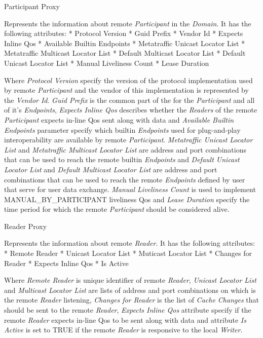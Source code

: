 \secc Participant Proxy

Represents the information about remote {\em Participant} in the {\em Domain}. It has the following attributes:
\begitems
* Protocol Version
* Guid Prefix
* Vendor Id
* Expects Inline Qos
* Available Builtin Endpoints
* Metatraffic Unicast Locator List
* Metatraffic Multicast Locator List
* Default Multicast Locator List
* Default Unicast Locator List
* Manual Liveliness Count
* Lease Duration
\enditems

Where {\em Protocol Version} specify the version of the  protocol implementation used by remote {\em Participant} and the vendor of this implementation is represented by the {\em Vendor Id}. {\em Guid Prefix} is the common part of the  for the {\em Participant} and all of it's {\em Endpoints}, {\em Expects Inline Qos} describes whether the {\em Readers} of the remote {\em Participant} expects in-line Qos sent along with data and {\em Available Builtin Endpoints} parameter specify which builtin {\em Endpoints} used for plug-and-play interoperability are available by remote {\em Participant}. {\em Metatraffic Unicast Locator List} and {\em Metatraffic Multicast Locator List} are  address and port combinations that can be used to reach the remote builtin {\em Endpoints} and {\em Default Unicast Locator List} and {\em Default Multicast Locator List} are  address and port combinations that can be used to reach the remote {\em Endpoints} defined by user that serve for user data exchange. {\em Manual Liveliness Count} is used to implement MANUAL\_BY\_PARTICIPANT liveliness Qos and {\em Lease Duration} specify the time period for which the remote {\em Participant} should be considered alive.

\secc Reader Proxy

Represents the information about remote {\em Reader}. It has the following attributes:
\begitems
* Remote Reader 
* Unicast Locator List
* Muticast Locator List
* Changes for Reader
* Expects Inline Qos
* Is Active
\enditems

Where {\em Remote Reader } is unique identifier of remote {\em Reader}, {\em Unicast Locator List} and {\em Multicast Locator List} are lists of  address and port combinations on which is the remote {\em Reader} listening, {\em Changes for Reader} is the list of {\em Cache Changes} that should be sent to the remote {\em Reader}, {\em Expects Inline Qos} attribute specify if the remote {\em Reader} expects in-line Qos to be sent along with data and attribute {\em Is Active} is set to TRUE if the remote {\em Reader} is responsive to the local {\em Writer}.

